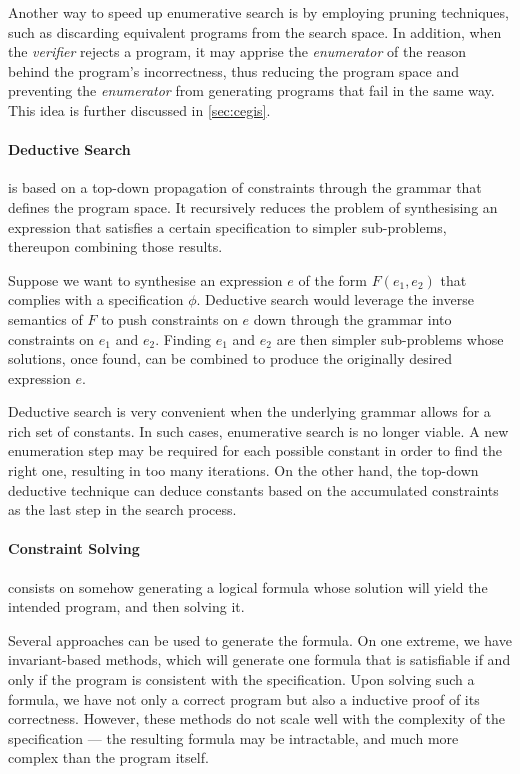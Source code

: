Another way to speed up enumerative search is by employing pruning techniques, such as discarding equivalent programs from the search space.
In addition, when the \textit{verifier} rejects a program, it may apprise the \textit{enumerator} of the reason behind the program's incorrectness, thus reducing the program space and preventing the \textit{enumerator} from generating programs that fail in the same way.
This idea is further discussed in \autoref{sec:cegis}.

\paragraph{Deductive Search} \cite{DBLP:conf/oopsla/PolozovG15} is based on a top-down propagation of constraints through the grammar that defines the program space. It recursively reduces the problem of synthesising an expression that satisfies a certain specification to simpler sub-problems, thereupon combining those results.

Suppose we want to synthesise an expression \(e\) of the form \(F(e_1, e_2)\) that complies with a specification \(\phi\). Deductive search would leverage the inverse semantics of \(F\) to push constraints on \(e\) down through the grammar into constraints on \(e_1\) and \(e_2\). Finding \(e_1\) and \(e_2\) are then simpler sub-problems whose solutions, once found, can be combined to produce the originally desired expression \(e\).

Deductive search is very convenient when the underlying grammar allows for a rich set of constants. In such cases, enumerative search is no longer viable. A new enumeration step may be required for each possible constant in order to find the right one, resulting in too many iterations. On the other hand, the top-down deductive technique can deduce constants based on the accumulated constraints as the last  step in the search process.

\paragraph{Constraint Solving} \cite{Solar-LezamaPhDThesis,DBLP:conf/popl/SrivastavaGF10} consists on somehow generating a logical formula whose solution will yield the intended program, and then solving it.

Several approaches can be used to generate the formula. On one extreme, we have invariant-based methods, which will generate one formula that is satisfiable if and only if the program is consistent with the specification. Upon solving such a formula, we have not only a correct program but also a inductive proof of its correctness.
However, these methods do not scale well with the complexity of the specification --- the resulting formula may be intractable, and much more complex than the program itself.

